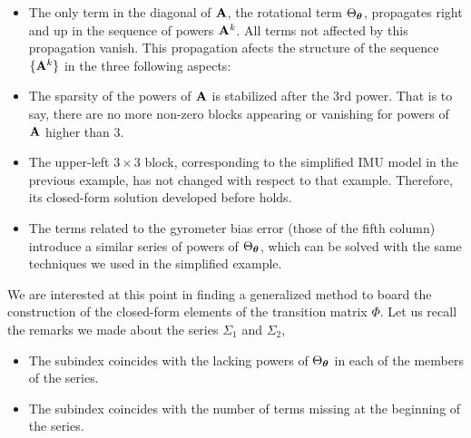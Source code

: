 \begin{itemize}
\item
The only term in the diagonal of ${\bf A}$, the rotational term $\Theta_{\bm \theta}$, propagates right and up in the sequence of powers ${\bf A}^k$. 
All terms not affected by this propagation vanish. 
This propagation afects the structure of the sequence $\{{\bf A}^k\}$ in the three following aspects:
\item 
The sparsity of the powers of ${\bf A}$ is stabilized after the 3rd power. 
That is to say, there are no more non-zero blocks appearing or vanishing for powers of ${\bf A}$ higher than 3.
\item 
The upper-left $3\times 3$ block, corresponding to the simplified IMU model in the previous example, has not changed with respect to that example. 
Therefore, its closed-form solution developed before holds.
\item 
The terms related to the gyrometer bias error (those of the fifth column) introduce a similar series of powers of $\Theta_{\bm \theta}$, which can be solved with the same techniques we used in the simplified example. 
\end{itemize}

We are interested at this point in finding a generalized method to board the construction of the closed-form elements of the transition matrix $\Phi$. 
Let us recall the remarks we made about the series $\Sigma_1$ and $\Sigma_2$,
%
\begin{itemize}
\item The subindex coincides with the lacking powers of $\Theta_{\bm \theta}$ in each of the members of the series.
\item The subindex coincides with the number of terms missing at the beginning of the series.
\end{itemize}

